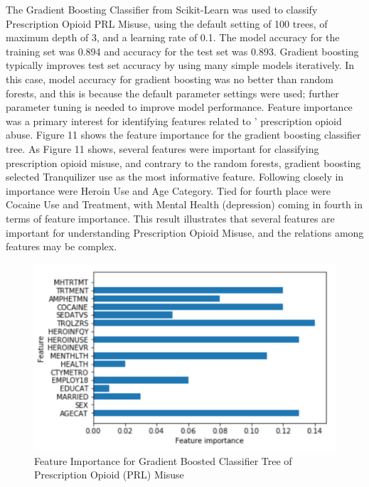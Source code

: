 \documentclass[sigconf]{acmart}
\begin{document}
The Gradient Boosting Classifier from Scikit-Learn was used to classify 
Prescription Opioid PRL Misuse, using the default setting of 100 trees, of 
maximum depth of 3, and a learning rate of 0.1. The model accuracy for the
training set was 0.894 and accuracy for the test set was 0.893. Gradient 
boosting typically improves test set accuracy by using many simple models 
iteratively. In this case, model accuracy for gradient boosting was no better 
than random forests, and this is because the default parameter settings were
used; further parameter tuning is needed to improve model performance. Feature 
importance was a primary interest for identifying features related to '
prescription opioid abuse. Figure 11 shows the feature importance for the 
gradient boosting classifier tree. As Figure 11 shows, several features were 
important for classifying prescription opioid misuse, and contrary to the 
random forests, gradient boosting selected Tranquilizer use as the most 
informative feature. Following closely in importance were Heroin Use and Age 
Category. Tied for fourth place were Cocaine Use and Treatment, with Mental 
Health (depression) coming in fourth in terms of feature importance. This 
result illustrates that several features are important for understanding 
Prescription Opioid Misuse, and the relations among features may be complex.

\begin{figure}[!ht]
  \centering\includegraphics[width=\columnwidth]{images/Figure11.pdf}
  \caption{Feature Importance for Gradient Boosted Classifier Tree of 
  Prescription Opioid (PRL) Misuse}
  \label{f:Figure11}
\end{figure}

\end{document}

